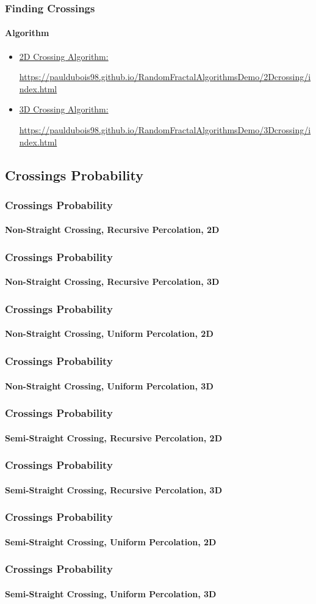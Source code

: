 \documentclass{beamer}
\begin{document}
	\begin{frame}
		\frametitle{Finding Crossings}
		\framesubtitle{Algorithm}
		\begin{itemize}
			\item \href{https://pauldubois98.github.io/RandomFractalAlgorithmsDemo/2Dcrossing/index.html}{2D Crossing Algorithm:}
			
			\url{https://pauldubois98.github.io/RandomFractalAlgorithmsDemo/2Dcrossing/index.html}
			
			\item \href{https://pauldubois98.github.io/RandomFractalAlgorithmsDemo/3Dcrossing/index.html}{3D Crossing Algorithm:}
			
			\url{https://pauldubois98.github.io/RandomFractalAlgorithmsDemo/3Dcrossing/index.html}
		\end{itemize}
	\end{frame}

	
	\subsection{Crossings Probability}
	\begin{frame}
		\frametitle{Crossings Probability}
		\framesubtitle{Non-Straight Crossing, Recursive Percolation, 2D}
	\end{frame}
	\begin{frame}
		\frametitle{Crossings Probability}
		\framesubtitle{Non-Straight Crossing, Recursive Percolation, 3D}
	\end{frame}
	\begin{frame}
		\frametitle{Crossings Probability}
		\framesubtitle{Non-Straight Crossing, Uniform Percolation, 2D}
	\end{frame}
	\begin{frame}
		\frametitle{Crossings Probability}
		\framesubtitle{Non-Straight Crossing, Uniform Percolation, 3D}
	\end{frame}
	
	\begin{frame}
		\frametitle{Crossings Probability}
		\framesubtitle{Semi-Straight Crossing, Recursive Percolation, 2D}
	\end{frame}
	\begin{frame}
		\frametitle{Crossings Probability}
		\framesubtitle{Semi-Straight Crossing, Recursive Percolation, 3D}
	\end{frame}
	\begin{frame}
		\frametitle{Crossings Probability}
		\framesubtitle{Semi-Straight Crossing, Uniform Percolation, 2D}
	\end{frame}
	\begin{frame}
		\frametitle{Crossings Probability}
		\framesubtitle{Semi-Straight Crossing, Uniform Percolation, 3D}
	\end{frame}
	
\end{document}
